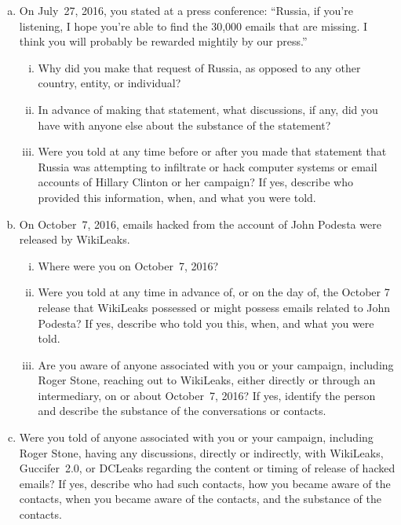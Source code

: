 \begin{enumerate}[a.]
\item On July~27, 2016, you stated at a press conference: ``Russia, if you're listening, I hope you're able to find the 30,000 emails that are missing.
I think you will probably be rewarded mightily by our press.''

\begin{enumerate}[i.]

\item Why did you make that request of Russia, as opposed to any other country, entity, or individual?

\item In advance of making that statement, what discussions, if any, did you have with anyone else about the substance of the statement?

\item Were you told at any time before or after you made that statement that Russia was attempting to infiltrate or hack computer systems or email accounts of Hillary Clinton or her campaign?
If yes, describe who provided this information, when, and what you were told.

\end{enumerate}

\item On October~7, 2016, emails hacked from the account of John Podesta were released by WikiLeaks.

\begin{enumerate}[i.]

\item Where were you on October~7, 2016?

\item Were you told at any time in advance of, or on the day of, the October 7 release that WikiLeaks possessed or might possess emails related to John Podesta?
If yes, describe who told you this, when, and what you were told.

\item Are you aware of anyone associated with you or your campaign, including Roger Stone, reaching out to WikiLeaks, either directly or through an intermediary, on or about October~7, 2016?
If yes, identify the person and describe the substance of the conversations or contacts.

\end{enumerate}

\item Were you told of anyone associated with you or your campaign, including Roger Stone, having any discussions, directly or indirectly, with WikiLeaks, Guccifer~2.0, or DCLeaks regarding the content or timing of release of hacked emails?
If yes, describe who had such contacts, how you became aware of the contacts, when you became aware of the contacts, and the substance of the contacts.


\end{enumerate}
